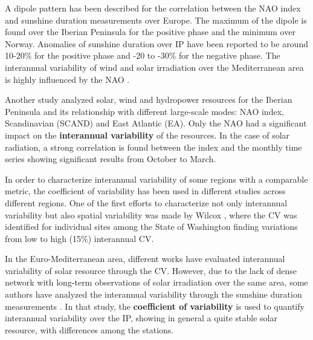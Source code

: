 
A dipole pattern has been described for the correlation between the NAO index and sunshine duration measurements \cite*{Pozo-Vazquez2004} over Europe. The maximum of the dipole is found over the Iberian Peninsula for the positive phase and the minimum over Norway. Anomalies of sunshine duration over IP have been reported to be around 10-20$\%$ for the positive phase and -20 to -30$\%$ for the negative phase. The interannual variability of wind and solar irradiation over the Mediterranean area is highly influenced by the NAO \cite*{pozo-Vazquez2011}.

Another study analyzed solar, wind and hydropower resources for the Iberian Peninsula and its relationship with different large-scale modes: NAO index, Scandinavian (SCAND) and East Atlantic (EA). Only the NAO had a significant impact on the \textbf{interannual variability} of the resources. In the case of solar radiation, a strong correlation is found between the index and the monthly time series \cite*{Jerez2013a} showing significant results from October to March.

In order to characterize interannual variability of some regions with a comparable metric, the coefficient of variability has been used in different studies across different regions. One of the first efforts to characterize not only interannual variability but also spatial variability was made by Wilcox \cite*{GueymardWilcox2011a}, where the CV was identified for individual sites among the State of Washington finding variations from low to high (15$\%$) interannual CV.


In the Euro-Mediterranean area, different works have evaluated interannual variability of solar resource through the CV. However, due to the lack of dense network with long-term observations of solar irradiation over the same area, some authors have analyzed the interannual variability through the sunshine duration measurements \cite*{Gil2015}. In that study, the \textbf{coefficient of variability} is used to quantify interannual variability over the IP, showing in general a quite stable solar resource, with differences among the stations. %



